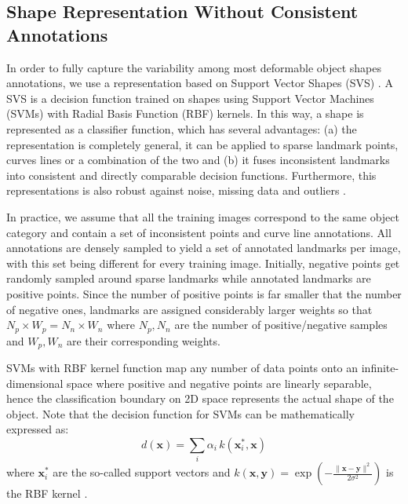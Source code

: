 \subsection{Shape Representation Without Consistent Annotations}
\label{sec:svs}

In order to fully capture the variability among most deformable object shapes annotations, we use a representation based on Support Vector Shapes (SVS) \cite{Nguyen2013}. A SVS is a decision function trained on shapes using Support Vector Machines (SVMs) with Radial Basis Function (RBF) kernels. In this way, a shape is represented as a classifier function, which has several advantages: (a) the representation is completely general, \eg it can be applied to sparse landmark points, curves lines or a combination of the two and (b) it fuses inconsistent landmarks into consistent and directly comparable decision functions. Furthermore, this representations is also robust against noise, missing data and outliers \cite{Nguyen2013}.

In practice, we assume that all the training images correspond to the same object category and contain a set of inconsistent points and curve line annotations. All annotations are densely sampled to yield a set of annotated landmarks per image, with this set being different for every training image. Initially, negative points get randomly sampled around sparse landmarks while annotated landmarks are positive points. Since the number of positive points is far smaller that the number of negative ones, landmarks are assigned considerably larger weights so that $N_p \times W_p=N_n \times W_n$ where $N_p, N_n$ are the number of positive/negative samples and $W_p, W_n$ are their corresponding weights.

SVMs with RBF kernel function map any number of data points onto an infinite-dimensional space where positive and negative points are linearly separable, hence the classification boundary on 2D space represents the actual shape of the object. Note that the decision function for SVMs can be mathematically expressed as:
\begin{equation} \label{eq:decisionfunc}
    d(\bm{x})=\sum_i\alpha_i \, k(\bm{x}_i^*,\bm{x})
\end{equation}
where $\bm{x}_i^*$ are the so-called support vectors and \mbox{$k(\bm{x}, \bm{y}) = \exp\left(-\frac{\|\bm{x} -\bm{y}\|^2}{2 \sigma^2}\right)$} is the RBF kernel .

